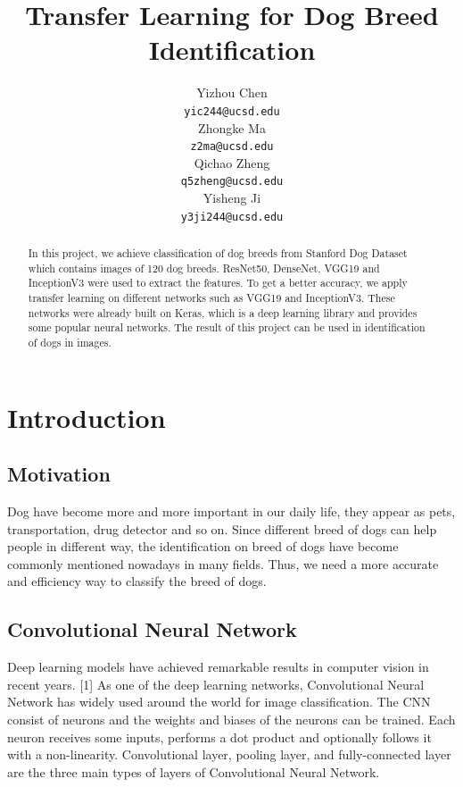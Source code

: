 \documentclass{article}
\title{Transfer Learning for Dog Breed Identification}
\author{%
  Yizhou Chen\\
  \texttt{yic244@ucsd.edu} \\
  \And
  Zhongke Ma\\
  \texttt{z2ma@ucsd.edu} \\
  \And
  Qichao Zheng\\
  \texttt{q5zheng@ucsd.edu} \\
  \And
  Yisheng Ji\\
  \texttt{y3ji244@ucsd.edu} \\
}
\begin{document}

\maketitle

\begin{abstract}
  In this project, we achieve classification of dog breeds from Stanford Dog Dataset which contains images of 120 dog breeds. ResNet50, DenseNet, VGG19 and InceptionV3 were used to extract the features. To get a better accuracy, we apply transfer learning on different networks such as VGG19 and InceptionV3. These networks were already built on Keras, which is a deep learning library and provides some popular neural networks. The result of this project can be used in identification of dogs in images.
\end{abstract}

\section{Introduction}

\subsection{Motivation}

Dog have become more and more important in our daily life, they appear as pets, transportation, drug detector and so on. Since different breed of dogs can help people in different way, the identification on breed of dogs have become commonly mentioned nowadays in many fields. Thus, we need a more accurate and efficiency way to classify the breed of dogs.

\subsection{Convolutional Neural Network}

Deep learning models have achieved remarkable results in computer vision in recent years. [1] As one of the deep learning networks, Convolutional Neural Network has widely used around the world for image classification. The CNN consist of neurons and the weights and biases of the neurons can be trained. Each neuron receives some inputs, performs a dot product and optionally follows it with a non-linearity. Convolutional layer, pooling layer, and fully-connected layer are the three main types of layers of Convolutional Neural Network.
\end{document}
